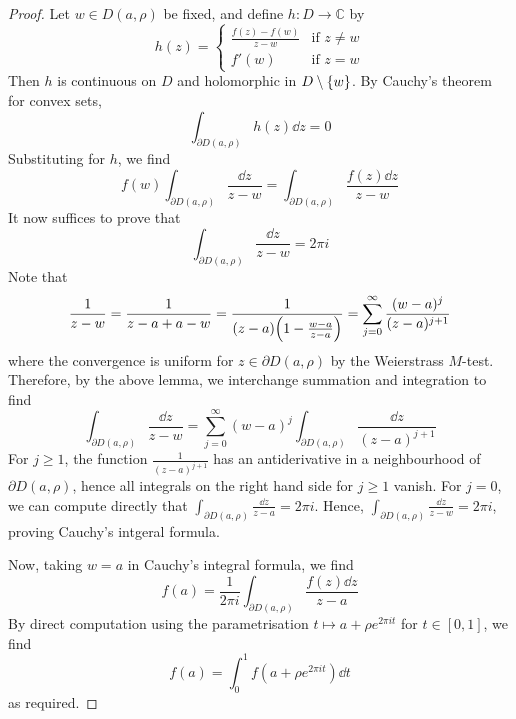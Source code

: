 \begin{proof}
	Let \( w \in D(a,\rho) \) be fixed, and define \( h \colon D \to \mathbb C \) by
	\[ h(z) = \begin{cases}
		\frac{f(z) - f(w)}{z - w} & \text{if } z \neq w \\
		f'(w) & \text{if } z = w
	\end{cases} \]
	Then \( h \) is continuous on \( D \) and holomorphic in \( D \setminus \qty{w} \).
	By Cauchy's theorem for convex sets,
	\[ \int_{\partial D(a,\rho)} h(z) \dd{z} = 0 \]
	Substituting for \( h \), we find
	\[ f(w) \int_{\partial D(a,\rho)} \frac{\dd{z}}{z-w} = \int_{\partial D(a,\rho)} \frac{f(z) \dd{z}}{z-w} \]
	It now suffices to prove that
	\[ \int_{\partial D(a,\rho)} \frac{\dd{z}}{z-w} = 2 \pi i \]
	Note that
	\[ \frac{1}{z-w} = \frac{1}{z-a+a-w} = \frac{1}{\qty(z-a)\qty(1 - \frac{w-a}{z-a})} = \sum_{j=0}^\infty \frac{(w-a)^j}{(z-a)^{j+1}} \]
	where the convergence is uniform for \( z \in \partial D(a,\rho) \) by the Weierstrass \( M \)-test.
	Therefore, by the above lemma, we interchange summation and integration to find
	\[ \int_{\partial D(a,\rho)} \frac{\dd{z}}{z-w} = \sum_{j=0}^\infty (w-a)^j \int_{\partial D(a,\rho)} \frac{\dd{z}}{(z-a)^{j+1}} \]
	For \( j \geq 1 \), the function \( \frac{1}{(z-a)^{j+1}} \) has an antiderivative in a neighbourhood of \( \partial D(a,\rho) \), hence all integrals on the right hand side for \( j \geq 1 \) vanish.
	For \( j = 0 \), we can compute directly that \( \int_{\partial D(a,\rho)} \frac{\dd{z}}{z-a} = 2 \pi i \).
	Hence, \( \int_{\partial D(a,\rho)} \frac{\dd{z}}{z-w} = 2 \pi i \), proving Cauchy's intgeral formula.

	Now, taking \( w = a \) in Cauchy's integral formula, we find
	\[ f(a) = \frac{1}{2\pi i} \int_{\partial D(a,\rho)} \frac{f(z) \dd{z}}{z-a} \]
	By direct computation using the parametrisation \( t \mapsto a + \rho e^{2\pi i t} \) for \( t \in [0,1] \), we find
	\[ f(a) = \int_0^1 f(a+\rho e^{2 \pi i t}) \dd{t} \]
	as required.
\end{proof}

